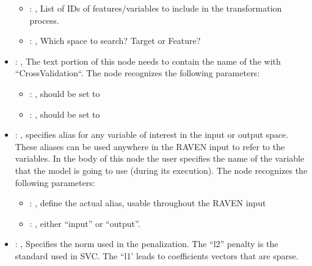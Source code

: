 \begin{itemize}
\begin{itemize}
        \item {}: , 
          List of IDs of features/variables to include in the transformation process.

        \item {}: , 
          Which space to search? Target or Feature?
      \end{itemize}

    \item {}: , 
      The text portion of this node needs to contain the name of the  with
               ``CrossValidation``.
      The  node recognizes the following parameters:
        \begin{itemize}
          \item {}: , 
            should be set to 
          \item {}: , 
            should be set to 
      \end{itemize}

    \item {}: , 
      specifies alias for         any variable of interest in the input or output space. These
      aliases can be used anywhere in the RAVEN input to         refer to the variables. In the body
      of this node the user specifies the name of the variable that the model is going to use
      (during its execution).
      The  node recognizes the following parameters:
        \begin{itemize}
          \item {}: , 
            define the actual alias, usable throughout the RAVEN input
          \item {}: , 
            either ``input'' or ``output''.
      \end{itemize}

    \item {}: \xmlDesc{[l1, l2]}, 
      Specifies the norm used in the penalization. The ``l2'' penalty is the standard used in SVC.
      The ``l1' leads to coefficients vectors that are sparse.


\end{itemize}
